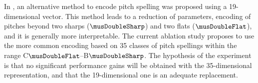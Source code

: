 
In , an alternative method
to encode pitch spelling was proposed using a 19-dimensional
vector. This method leads to a reduction of parameters,
encoding of pitches beyond two sharps ($\musDoubleSharp$)
and two flats ($\musDoubleFlat$), and it is generally more
interpretable. The current ablation study proposes to use
the more common encoding based on 35 classes of pitch
spellings within the range
C$\musDoubleFlat$--B$\musDoubleSharp$. The hypothesis of the
experiment is that no significant performance gains will be
obtained with the 35-dimensional representation, and that
the 19-dimensional one is an adequate replacement.

